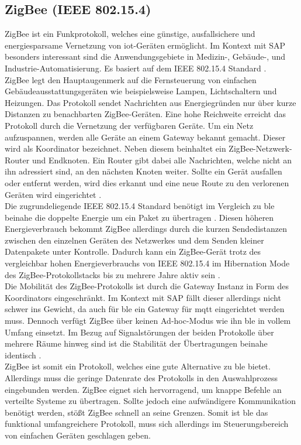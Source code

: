 \subsection{ZigBee (IEEE 802.15.4)}
\label{ss:vergleich:zigbee}

\noindent ZigBee ist ein Funkprotokoll, welches eine günstige, ausfallsichere und energiesparsame Vernetzung von \ac{iot}-Geräten ermöglicht. Im Kontext mit SAP besonders interessant sind die Anwendungsgebiete in Medizin-, Gebäude-, und Industrie-Automatisierung. Es basiert auf dem IEEE 802.15.4 Standard \cite[Seite 195]{Gessler15:WNN}.\\  
\noindent ZigBee legt den Hauptaugenmerk auf die Fernsteuerung von einfachen Gebäudeausstattungsgeräten wie beispielsweise Lampen, Lichtschaltern und Heizungen. Das Protokoll sendet Nachrichten aus Energiegründen nur über kurze Distanzen zu benachbarten ZigBee-Geräten. Eine hohe Reichweite erreicht das Protokoll durch die Vernetzung der verfügbaren Geräte. Um ein Netz aufzuspannen, werden alle Geräte an einem Gateway bekannt gemacht. Dieser wird als Koordinator bezeichnet. Neben diesem beinhaltet ein ZigBee-Netzwerk-Router und Endknoten. Ein Router gibt dabei alle Nachrichten, welche nicht an ihn adressiert sind, an den nächsten Knoten weiter. Sollte ein Gerät ausfallen oder entfernt werden, wird dies erkannt und eine neue Route zu den verlorenen Geräten wird eingerichtet \cite{ZIG20:WWW}.\\
\noindent Die zugrundeliegende IEEE 802.15.4 Standard benötigt im Vergleich zu \ac{ble} beinahe die doppelte Energie um ein Paket zu übertragen \cite[Seite 4]{Fafoutis16:BOI}. Diesen höheren Energieverbrauch bekommt ZigBee allerdings durch die kurzen Sendedistanzen zwischen den einzelnen Geräten des Netzwerkes und dem Senden kleiner Datenpakete unter Kontrolle. Dadurch kann ein ZigBee-Gerät trotz des vergleichbar hohen Energieverbrauchs von IEEE 802.15.4 im Hibernation Mode des ZigBee-Protokollstacks bis zu mehrere Jahre aktiv sein \cite[Seite 267]{Gessler15:WNN}.\\
\noindent Die Mobilität des ZigBee-Protokolls ist durch die Gateway Instanz in Form des Koordinators eingeschränkt. Im Kontext mit SAP fällt dieser allerdings nicht schwer ins Gewicht, da auch für \ac{ble} ein Gateway für \ac{mqtt} eingerichtet werden muss. Dennoch verfügt ZigBee über keinen Ad-hoc-Modus wie ihn \ac{ble} in vollem Umfang einsetzt. Im Bezug auf Signalstörungen der beiden Protokolle über mehrere Räume hinweg sind ist die Stabilität der Übertragungen beinahe identisch \cite[Seite 6]{Fafoutis16:BOI}.\\
\noindent ZigBee ist somit ein Protokoll, welches eine gute Alternative zu \ac{ble} bietet. Allerdings muss die geringe Datenrate des Protokolls in den Auswahlprozess eingebunden werden. ZigBee eignet sich hervorragend, um knappe Befehle an verteilte Systeme zu übertragen. Sollte jedoch eine aufwändigere Kommunikation benötigt werden, stößt ZigBee schnell an seine Grenzen. Somit ist \ac{ble} das funktional umfangreichere Protokoll, muss sich allerdings im Steuerungsbereich von einfachen Geräten geschlagen geben.\\

